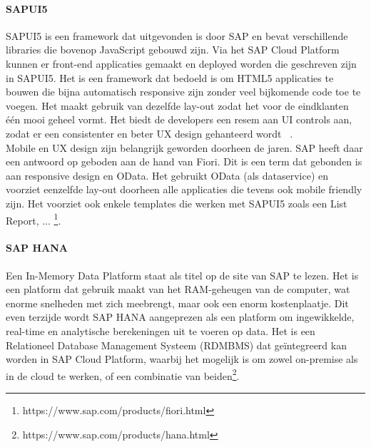     \paragraph{SAPUI5}
    SAPUI5 is een framework dat uitgevonden is door SAP en bevat verschillende libraries die bovenop JavaScript gebouwd zijn. Via het SAP Cloud Platform kunnen er front-end applicaties gemaakt en deployed worden die geschreven zijn in SAPUI5. Het is een framework dat bedoeld is om HTML5 applicaties te bouwen die bijna automatisch responsive zijn zonder veel bijkomende code toe te voegen.
    Het maakt gebruik van dezelfde lay-out zodat het voor de eindklanten één mooi geheel vormt. Het biedt de developers een resem aan UI controls aan, zodat er een consistenter en beter UX design gehanteerd wordt ~\autocite{SAPSEa}. \\
    Mobile en UX design zijn belangrijk geworden doorheen de jaren. SAP heeft daar een antwoord op geboden aan de hand van Fiori. Dit is een term dat gebonden is aan responsive design en OData. Het gebruikt OData (als dataservice) en voorziet eenzelfde lay-out doorheen alle applicaties die tevens ook mobile friendly zijn. Het voorziet ook enkele templates die werken met SAPUI5 zoals een List Report, ... \footnote{https://www.sap.com/products/fiori.html}.
    
    \paragraph{SAP HANA}
    Een In-Memory Data Platform staat als titel op de site van SAP te lezen. Het is een platform dat gebruik maakt van het RAM-geheugen van de computer, wat enorme snelheden met zich meebrengt, maar ook een enorm kostenplaatje. Dit even terzijde wordt SAP HANA aangeprezen als een platform om ingewikkelde, real-time en analytische berekeningen uit te voeren op data.
    Het is een Relationeel Database Management Systeem (RDMBMS) dat geïntegreerd kan worden in SAP Cloud Platform, waarbij het mogelijk is om zowel on-premise als in de cloud te werken, of een combinatie van beiden\footnote{https://www.sap.com/products/hana.html}.
